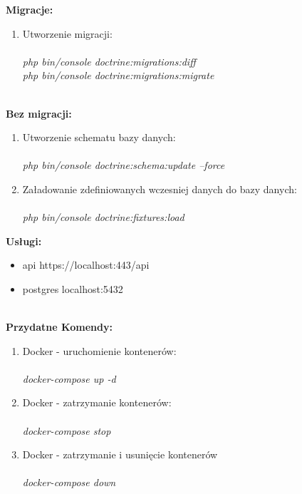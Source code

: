 \documentclass{article}
\begin{document}
\textbf{Migracje:}\\
\begin{enumerate}
\item Utworzenie migracji: \\\\
 \emph{php bin/console doctrine:migrations:diff} \\
 \emph{php bin/console doctrine:migrations:migrate} \\\\
  \end{enumerate}
 \textbf{Bez migracji:}\\
 \begin{enumerate}
\item Utworzenie schematu bazy danych: \\\\
 \emph{php bin/console doctrine:schema:update --force} \\
 \item Załadowanie zdefiniowanych wczesniej danych do bazy danych: \\\\
 \emph{php bin/console doctrine:fixtures:load} \\
 \end{enumerate}






\textbf{Usługi:}
    \begin{itemize}
        \item api https://localhost:443/api
        \item postgres localhost:5432 \\\\
    \end{itemize}
    
    
   
\textbf{Przydatne Komendy:}\\
\begin{enumerate}
\item Docker - uruchomienie kontenerów: \\\\
 \emph{docker-compose up -d} \\
 \item Docker - zatrzymanie kontenerów: \\\\
 \emph{docker-compose stop} \\
 \item Docker - zatrzymanie i usunięcie kontenerów \\\\
 \emph{docker-compose down} \\
  \end{enumerate}
\end{document}
